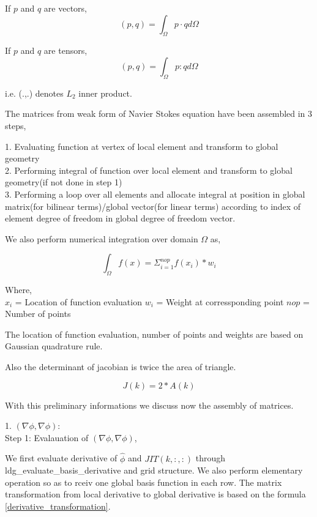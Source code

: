 \documentclass[a4paper,10pt]{book}
\begin{document}
If $p$ and $q$ are vectors,
\begin{equation}\label{Inner product vectors}
(p,q)=\int_{\Omega} p \cdot q d\Omega
\end{equation}

If $p$ and $q$ are tensors,
\begin{equation}\label{Inner product tensors}
(p,q)=\int_{\Omega} p:q d\Omega
\end{equation}

i.e. (.,.) denotes $L_2$ inner product.

The matrices from weak form of Navier Stokes equation have been assembled in 3 steps,

1. Evaluating function at vertex of local element and transform to global geometry\\
2. Performing integral of function over local element and transform to global geometry(if not done in step 1)\\
3. Performing a loop over all elements and allocate integral at position in global matrix(for bilinear terms)/global vector(for linear terms) according to index of element degree of freedom in global degree of freedom vector.

We also perform numerical integration over domain $\Omega$ as,

\begin{equation}\label{numerical integration}
\int_{\Omega} f(x) = \Sigma_{i=1}^{nop} f(x_i) * w_i
\end{equation}

Where, \\

$x_i$ = Location of function evaluation
$w_i$ = Weight at corressponding point
$nop$ = Number of points

The location of function evaluation, number of points and weights are based on Gaussian quadrature rule.

Also the determinant of jacobian is twice the area of triangle.

\begin{equation}\label{determinant to area}
J(k) = 2*A(k)
\end{equation}

With this preliminary informations we discuss now the assembly of matrices.

1. $(\nabla \phi, \nabla \phi)$:\\

Step 1: Evalauation of $(\nabla \phi , \nabla \phi)$,

We first evaluate derivative of $\hat{\phi}$ and $JIT(k,:,:)$ through ldg\_evaluate\_basis\_derivative and grid structure. We also perform elementary operation so as to rceiv one global basis function in each row. The matrix transformation from local derivative to global derivative is based on the formula \ref{derivative_transformation}.
\end{document}
